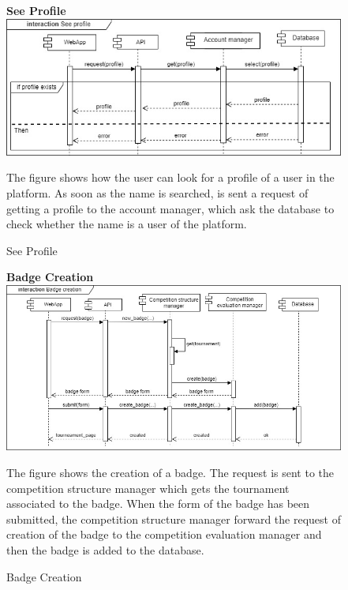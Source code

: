 \begin{enumerate}[label=\textbf{[UC\arabic*]}]
    \begin{figure}
    \item \textbf{See Profile}
        \centering
        \includegraphics[width= \textwidth]{Images/See_Profile.jpg}
        \caption{See Profile}
        \label{fig:enter-label}
        \raggedright The figure shows how the user can look for a profile of a user in the platform. As soon as the name is searched, is sent a request of getting a profile to the account manager, which ask the database to check whether the name is a user of the platform.
    \end{figure}
    \begin{figure}
    \item \textbf{Badge Creation}
        \centering 
        \includegraphics[width= \textwidth]{Images/Badge_Creation.jpg}
        \caption{Badge Creation}
        \label{fig:enter-label}
        \raggedright The figure shows the creation of a badge. The request is sent to the competition structure manager which gets the tournament associated to the badge. When the form of the badge has been submitted, the competition structure manager forward the request of creation of the badge to the competition evaluation manager and then the badge is added to the database.
    \end{figure}
\end{enumerate}
\pagebreak

